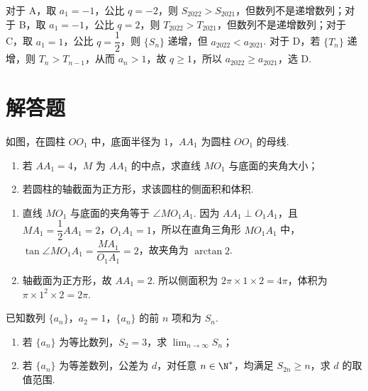 \begin{solution}
对于 A，取 \(a_1=-1\)，公比 \(q=-2\)，则 \(S_{2022}>S_{2021}\)，但数列不是递增数列；对于 B，取 \(a_1=-1\)，公比 \(q=2\)，则 \(T_{2022}>T_{2021}\)，但数列不是递增数列；对于 C，取 \(a_1=1\)，公比 \(q=\dfrac12\)，则 \(\{S_n\}\) 递增，但 \(a_{2022}<a_{2021}\). 对于 D，若 \(\{T_n\}\) 递增，则 \(T_n>T_{n-1}\)，从而 \(a_n>1\)，故 \(q\ge1\)，所以 \(a_{2022}\ge a_{2021}\)，选 D.
\end{solution}

\section{解答题}

\begin{problem}
如图，在圆柱 \(OO_1\) 中，底面半径为 \(1\)，\(AA_1\) 为圆柱 \(OO_1\) 的母线.

\begin{enumerate}
\item 若 \(AA_1=4\)，\(M\) 为 \(AA_1\) 的中点，求直线 \(MO_1\) 与底面的夹角大小；
\item 若圆柱的轴截面为正方形，求该圆柱的侧面积和体积.
\end{enumerate}

\end{problem}

\begin{solution}
\begin{enumerate}
\item 直线 \(MO_1\) 与底面的夹角等于 \(\angle MO_1A_1\). 因为 \(AA_1\perp O_1A_1\)，且 \(MA_1=\dfrac12AA_1=2\)，\(O_1A_1=1\)，所以在直角三角形 \(MO_1A_1\) 中，\(\tan\angle MO_1A_1=\dfrac{MA_1}{O_1A_1}=2\)，故夹角为 \(\arctan2\).
\item 轴截面为正方形，故 \(AA_1=2\). 所以侧面积为 \(2\pi\times1\times2=4\pi\)，体积为 \(\pi\times1^2\times2=2\pi\).
\end{enumerate}
\end{solution}

\begin{problem}
已知数列 \(\{a_n\}\)，\(a_2=1\)，\(\{a_n\}\) 的前 \(n\) 项和为 \(S_n\).

\begin{enumerate}
\item 若 \(\{a_n\}\) 为等比数列，\(S_2=3\)，求 \(\displaystyle\lim_{n\to\infty}S_n\)；
\item 若 \(\{a_n\}\) 为等差数列，公差为 \(d\)，对任意 \(n\in\N^*\)，均满足 \(S_{2n}\ge n\)，求 \(d\) 的取值范围.
\end{enumerate}
\end{problem}


